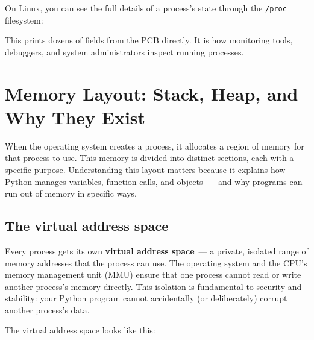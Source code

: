 \noindent{}On Linux, you can see the full details of a process's state through the \texttt{/proc} filesystem:

\begin{codebox}[short]

\begin{Shaded}
\begin{Highlighting}[]
\end{Highlighting}
\end{Shaded}

\end{codebox}

\noindent{}This prints dozens of fields from the PCB directly. It is how monitoring tools, debuggers, and system administrators inspect running processes.

\setcounter{section}{4}
\section{Memory Layout: Stack, Heap, and Why They Exist}\label{01-command-to-process:15-memory-layout-stack-heap-and-why-they-exist}

When the operating system creates a process, it allocates a region of memory for that process to use. This memory is divided into distinct sections, each with a specific purpose. Understanding this layout matters because it explains how Python manages variables, function calls, and objects~--- and why programs can run out of memory in specific ways.

\subsection*{The virtual address space}\label{01-command-to-process:the-virtual-address-space}

Every process gets its own \textbf{virtual address space}~--- a private, isolated range of memory addresses that the process can use. The operating system and the CPU's memory management unit (MMU) ensure that one process cannot read or write another process's memory directly. This isolation is fundamental to security and stability: your Python program cannot accidentally (or deliberately) corrupt another process's data.

The virtual address space looks like this:

